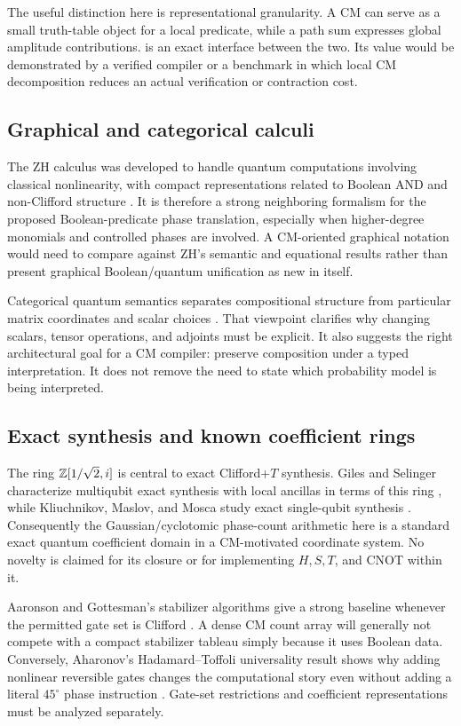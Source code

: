 The useful distinction here is representational granularity. A CM can serve as a small truth-table object for a local predicate, while a path sum expresses global amplitude contributions.  is an exact interface between the two. Its value would be demonstrated by a verified compiler or a benchmark in which local CM decomposition reduces an actual verification or contraction cost.

\subsection{Graphical and categorical calculi}
The ZH calculus was developed to handle quantum computations involving classical nonlinearity, with compact representations related to Boolean AND and non-Clifford structure \cite{zh}. It is therefore a strong neighboring formalism for the proposed Boolean-predicate phase translation, especially when higher-degree monomials and controlled phases are involved. A CM-oriented graphical notation would need to compare against ZH's semantic and equational results rather than present graphical Boolean/quantum unification as new in itself.

Categorical quantum semantics separates compositional structure from particular matrix coordinates and scalar choices \cite{abramsky}. That viewpoint clarifies why changing scalars, tensor operations, and adjoints must be explicit. It also suggests the right architectural goal for a CM compiler: preserve composition under a typed interpretation. It does not remove the need to state which probability model is being interpreted.

\subsection{Exact synthesis and known coefficient rings}
The ring $\mathbb Z[1/\sqrt2,i]$ is central to exact Clifford+$T$ synthesis. Giles and Selinger characterize multiqubit exact synthesis with local ancillas in terms of this ring \cite{giles}, while Kliuchnikov, Maslov, and Mosca study exact single-qubit synthesis \cite{kmm}. Consequently the Gaussian/cyclotomic phase-count arithmetic here is a standard exact quantum coefficient domain in a CM-motivated coordinate system. No novelty is claimed for its closure or for implementing $H,S,T$, and CNOT within it.

Aaronson and Gottesman's stabilizer algorithms give a strong baseline whenever the permitted gate set is Clifford \cite{aaronson}. A dense CM count array will generally not compete with a compact stabilizer tableau simply because it uses Boolean data. Conversely, Aharonov's Hadamard--Toffoli universality result shows why adding nonlinear reversible gates changes the computational story even without adding a literal $45^\circ$ phase instruction \cite{aharonov}. Gate-set restrictions and coefficient representations must be analyzed separately.

